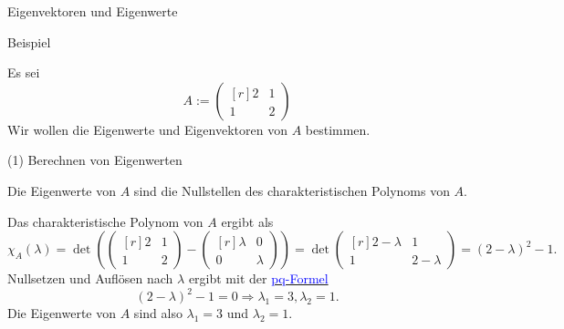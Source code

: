 \documentclass[
  8pt,
  ignorenonframetext,
]{beamer}
\begin{document}
\begin{frame}{Eigenvektoren und Eigenwerte}
\protect\hypertarget{eigenvektoren-und-eigenwerte-5}{}

Beispiel

\footnotesize

Es sei \begin{equation}
A :=
\begin{pmatrix*}[r]
2 & 1 \\
1 & 2\end{pmatrix*}
\end{equation} Wir wollen die Eigenwerte und Eigenvektoren von \(A\)
bestimmen. \vspace{1mm}

\small

\noindent (1) Berechnen von Eigenwerten \footnotesize

Die Eigenwerte von \(A\) sind die Nullstellen des charakteristischen
Polynoms von \(A\).

Das charakteristische Polynom von \(A\) ergibt als \begin{equation}
\chi_A(\lambda)
=
\det\left(
\begin{pmatrix*}[r]
2 & 1 \\
1 & 2\end{pmatrix*}
-
\begin{pmatrix*}[r]
\lambda & 0 \\
0       & \lambda
\end{pmatrix*}
\right)
=
\det
\begin{pmatrix*}[r]
2 - \lambda & 1 \\
1 & 2 - \lambda
\end{pmatrix*}
= (2 - \lambda)^2 - 1.
\end{equation} Nullsetzen und Auflösen nach \(\lambda\) ergibt mit der
\href{https://de.wikipedia.org/wiki/Quadratische_Gleichung}{\textcolor{blue}{pq-Formel}}
\begin{equation}
(2 - \lambda)^2 - 1 = 0 \Rightarrow \lambda_1 = 3, \lambda_2 = 1.
\end{equation} Die Eigenwerte von \(A\) sind also \(\lambda_1 = 3\) und
\(\lambda_2 = 1\).
\end{frame}
\end{document}

